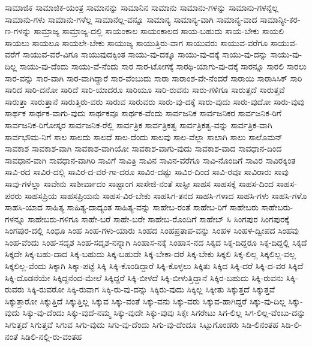 {ಸಾಮಾಜಿಕ
ಸಾಮಾಜಿಕ-ಯಂತ್ರ
ಸಾಮಾನನ್ನು
ಸಾಮಾನಿನ
ಸಾಮಾನು
ಸಾಮಾನು-ಗಳನ್ನು
ಸಾಮಾನು-ಗಳನ್ನೆಲ್ಲ
ಸಾಮಾನು-ಗಳು
ಸಾಮಾನು-ಗಳೆಲ್ಲ
ಸಾಮಾನೆಲ್ಲ-ವನ್ನೂ
ಸಾಮಾನ್ಯ
ಸಾಮಾನ್ಯ-ವಾಗಿ
ಸಾಮಾನ್ಯ-ವಾದ
ಸಾಮಾನ್ಯೀ-ಕರ-ಣ-ಗಳನ್ನು
ಸಾಮ್ರಾಜ್ಯ
ಸಾಮ್ರಾಜ್ಯ-ದಲ್ಲಿ
ಸಾಯಂಕಾಲ
ಸಾಯಂಕಾಲದ
ಸಾಯ-ಬಹುದು
ಸಾಯ-ಬೇಕು
ಸಾಯಲಿ
ಸಾಯಲು
ಸಾಯಲೂ
ಸಾಯಲೇ-ಬೇಕು
ಸಾಯುಜ್ಯ
ಸಾಯುತ್ತಿರು-ವಾಗ
ಸಾಯುವರು
ಸಾಯುವ-ವರೆಗೂ
ಸಾಯುವ-ವರೆಗೆ
ಸಾಯುವ-ವರೆ-ವಿಗೂ
ಸಾಯುವುದಕ್ಕಿಂತ
ಸಾಯು-ವು-ದಕ್ಕೂ
ಸಾಯು-ವು-ದಕ್ಕೆ
ಸಾಯು-ವು-ದನ್ನು
ಸಾಯು-ವು-ದಿಲ್ಲ
ಸಾಯು-ವು-ದೆಂದು
ಸಾಯು-ವೆ-ನೆಂದು
ಸಾರ
ಸಾರ-ಟೋಗಕ್ಕೆ
ಸಾರಥಿ-ಯಾಗು-ವು-ದಕ್ಕೆ
ಸಾರನ್ನೂ
ಸಾರಲಿ
ಸಾರಲು
ಸಾರ-ವನ್ನು
ಸಾರ-ವಾಗಿ
ಸಾರ-ವಾಗಿದ್ದಾರೆ
ಸಾರ-ವೆಂಬುದು
ಸಾರಾ
ಸಾರಾಂಶ-ವೇ-ನೆಂದರೆ
ಸಾರಾಯಿ
ಸಾರಾಸಿಸಿಕ್
ಸಾರಿ
ಸಾರಿದ
ಸಾರಿ-ದನೋ
ಸಾರಿದೆ
ಸಾರಿ-ಯಾದರೂ
ಸಾರಿಯೂ
ಸಾರಿ-ರುವನು
ಸಾರು-ಗಳಿಗೂ
ಸಾರುತ್ತದೆ
ಸಾರುತ್ತವೆ
ಸಾರುತ್ತಾ
ಸಾರುತ್ತಾನೆ
ಸಾರುತ್ತಿರು-ವರು
ಸಾರುವ
ಸಾರುವರು
ಸಾರು-ವು-ದಕ್ಕೆ
ಸಾರು-ವುದು
ಸಾರು-ವುದೋ
ಸಾರು-ವುವು
ಸಾರ್ಥಕ
ಸಾರ್ಥಕ-ವಾಗು-ವುದು
ಸಾರ್ಥಕವೂ
ಸಾರ್ಥಕ-ವೆಂದು
ಸಾರ್ವಜನಿಕ
ಸಾರ್ವಜನಿಕರ
ಸಾರ್ವಜನಿಕ-ರಿಗೆ
ಸಾರ್ವಜನಿಕ-ರಿಗೋಸ್ಕರ
ಸಾರ್ವಜನಿಕ-ರೆಲ್ಲಿ
ಸಾರ್ವತ್ರಿಕ
ಸಾರ್ವತ್ರಿಕತ್ವ
ಸಾರ್ವತ್ರಿಕತ್ವ-ವನ್ನು
ಸಾರ್ವತ್ರಿಕ-ವಾಗಿ
ಸಾರ್ವಭೌಮ-ನಿಗೆ
ಸಾಲ
ಸಾಲದು
ಸಾಲದೆ
ಸಾಲ-ದೆಂದು
ಸಾಲವು
ಸಾಲ-ವೆಲ್ಲಾ
ಸಾಲಾಗಿ
ಸಾಲು
ಸಾಲೊಮನ್
ಸಾವಕಾಶ
ಸಾವಕಾಶ-ವಾಗಿ
ಸಾವಕಾಶ-ವಾಗಿಯೋ
ಸಾವಕಾಶ-ವಾಗು-ವುದು
ಸಾವಕಾಶ-ವಾದ
ಸಾವಧಾನ-ದಿಂದ
ಸಾವಧಾನ-ವಾಗಿ
ಸಾವಧಾನ-ವಾಗಿರಿ
ಸಾವಿಗೆ
ಸಾವಿತ್ರಿ
ಸಾವಿನ
ಸಾವಿನ-ವರೆಗೂ
ಸಾವಿ-ನೊಂದಿಗೆ
ಸಾವಿರ
ಸಾವಿರಕ್ಕಿಂತ
ಸಾವಿ-ರದ
ಸಾವಿರ-ದಲ್ಲಿ
ಸಾವಿರ-ದ-ವರೆ-ಗಾ-ದರೂ
ಸಾವಿರ-ದಷ್ಟು
ಸಾವಿರ-ದಿಂದ
ಸಾವಿ-ರವೂ
ಸಾವಿರಾರು
ಸಾವು
ಸಾವು-ಗಳೆಲ್ಲಾ
ಸಾವೇನು
ಸಾಶೀರ್ವಾದಂ
ಸಾಷ್ಟಾಂಗ
ಸಾಸೇಜಿ-ನಂತೆ
ಸಾಸ್ಫೀ
ಸಾಹಸ
ಸಾಹಸಕ್ಕೆ
ಸಾಹಸ-ದಿಂದ
ಸಾಹಸ-ಪರರು
ಸಾಹಸಪ್ರಿಯ
ಸಾಹಸಪ್ರಿಯನು
ಸಾಹಸ-ವಿರ-ಬೇಕು
ಸಾಹಸಿಗ-ತನದ
ಸಾಹಸಿ-ಗಳಾದ
ಸಾಹಸಿ-ಗಳು
ಸಾಹಸಿ-ಗಳೊ
ಸಾಹಸಿ-ಯಾದ
ಸಾಹಿತ್ಯ
ಸಾಹಿತ್ಯ-ದಾದ್ಯಂತ
ಸಾಹಿತ್ಯ-ವನ್ನು
ಸಾಹೇಬ-ರಂತೆ
ಸಾಹೇಬ-ರಿಗೆ
ಸಾಹೇಬರು
ಸಾಹೇಬರು-ಗಳನ್ನೂ
ಸಾಹೇಬರು-ಗಳಿಗೂ
ಸಾಹೇ-ಬರೆ
ಸಾಹೇ-ಬರೇ
ಸಾಹೇಬ-ರೊಂದಿಗೆ
ಸಾಹೇಬ್
ಸಿ
ಸಿಂಗಪುರ
ಸಿಂಗಪುರಕ್ಕೆ
ಸಿಂಗಪುರ-ದಲ್ಲಿ
ಸಿಂಧೂ
ಸಿಂಹ
ಸಿಂಹ-ಗಳು-ಯಾರು
ಸಿಂಹದ
ಸಿಂಹಪ್ರತಾಪ-ವನ್ನು
ಸಿಂಹಳ
ಸಿಂಹಳ-ದ್ವೀಪದ
ಸಿಂಹವು
ಸಿಂಹ-ವೆಂದು
ಸಿಂಹ-ಸದೃಶ
ಸಿಂಹ-ಸದೃಶ-ನನ್ನಾಗಿ
ಸಿಂಹಾಸ-ನಕ್ಕೆ
ಸಿಂಹಾಸ-ನದ
ಸಿಕ್ಕದ
ಸಿಕ್ಕ-ದಿದ್ದರೂ
ಸಿಕ್ಕ-ದಿದ್ದಲ್ಲಿ
ಸಿಕ್ಕದೆ
ಸಿಕ್ಕದೇ
ಸಿಕ್ಕ-ಬಹು-ದಾದ
ಸಿಕ್ಕ-ಬಹುದು
ಸಿಕ್ಕ-ಬಹುದೇ
ಸಿಕ್ಕ-ಬೇಕಾ-ದರೆ
ಸಿಕ್ಕ-ಬೇಕು
ಸಿಕ್ಕಲಿ
ಸಿಕ್ಕ-ಲಿಲ್ಲ
ಸಿಕ್ಕಲಿಲ್ಲ-ವಲ್ಲ
ಸಿಕ್ಕಲಿಲ್ಲ-ವೆಂದು
ಸಿಕ್ಕಾಗಿ
ಸಿಕ್ಕಾ-ಪಟ್ಟೆ
ಸಿಕ್ಕಿ
ಸಿಕ್ಕಿ-ಕೊಂಡಿದ್ದಾರೆ
ಸಿಕ್ಕಿ-ಕೊಳ್ಳಲು
ಸಿಕ್ಕಿತು
ಸಿಕ್ಕಿದ
ಸಿಕ್ಕಿ-ದರೆ
ಸಿಕ್ಕಿ-ದ-ವರ
ಸಿಕ್ಕಿದೆ
ಸಿಕ್ಕಿ-ದೊಡನೆಯೇ
ಸಿಕ್ಕಿದ್ದನೆಂದ-ಮೇಲೆ
ಸಿಕ್ಕಿದ್ದರೆ
ಸಿಕ್ಕಿ-ಬೀಳದೆ
ಸಿಕ್ಕಿ-ಬೀಳುತ್ತಿದ್ದಾನೆ
ಸಿಕ್ಕಿರ-ಬಹುದು
ಸಿಕ್ಕಿ-ರುವನು
ಸಿಕ್ಕಿ-ರುವರು
ಸಿಕ್ಕಿ-ರುವರೋ
ಸಿಕ್ಕಿ-ರುವಾಗ
ಸಿಕ್ಕಿ-ರು-ವು-ದನ್ನು
ಸಿಕ್ಕಿರು-ವುದು
ಸಿಕ್ಕಿಲ್ಲ
ಸಿಕ್ಕೀತು
ಸಿಕ್ಕುತ್ತದೆ
ಸಿಕ್ಕುತ್ತವೆ
ಸಿಕ್ಕುತ್ತಾರೋ
ಸಿಕ್ಕುತ್ತಿದೆ
ಸಿಕ್ಕುತ್ತಿಲ್ಲ
ಸಿಕ್ಕುವ
ಸಿಕ್ಕು-ವಂತೆ
ಸಿಕ್ಕು-ವನು
ಸಿಕ್ಕು-ವರು
ಸಿಕ್ಕುವ-ಹಾಗಿದ್ದರೆ
ಸಿಕ್ಕು-ವು-ದಿಲ್ಲ
ಸಿಕ್ಕು-ವುದು
ಸಿಕ್ಕು-ವು-ದೆಂದು
ಸಿಕ್ಕು-ವುದೆ-ನಮ್ಮ
ಸಿಕ್ಕು-ವುದೇ
ಸಿಕ್ಕು-ವುವು
ಸಿಕ್ಕೇ
ಸಿಗರೇಟು
ಸಿಗ-ಲಿಲ್ಲ
ಸಿಗ-ಲಿಲ್ಲ-ವೆಂಬು-ದನ್ನು
ಸಿಗುತ್ತದೆ
ಸಿಗುತ್ತವೆ
ಸಿಗುವ
ಸಿಗು-ವುದು
ಸಿಗು-ವು-ದೆಂದು
ಸಿಗು-ವು-ದೆಂದೂ
ಸಿಟ್ಟುಗೊಂಡರು
ಸಿಡಿ-ಲಿನಂತಹ
ಸಿಡಿ-ಲಿ-ನಂತೆ
ಸಿಡಿಲಿ-ನಲ್ಲಿ-ರು-ವಂತಹ
}
